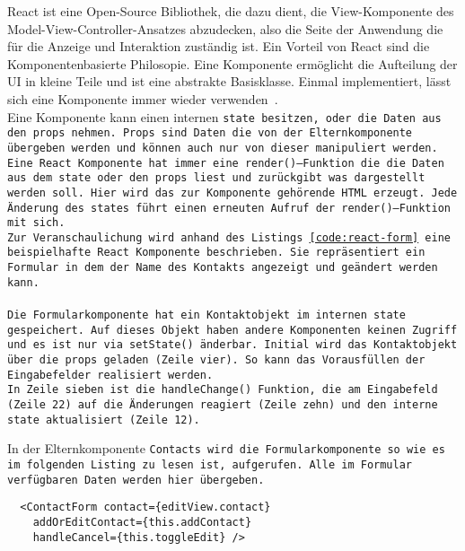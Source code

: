 React ist eine Open-Source Bibliothek, die dazu dient, die View-Komponente des Model-View-Controller-Ansatzes abzudecken, also die Seite der Anwendung die für die Anzeige und Interaktion zuständig ist. Ein Vorteil von React sind die Komponentenbasierte Philosopie. Eine Komponente ermöglicht die Aufteilung der \gls{UI} in kleine Teile und ist eine abstrakte Basisklasse. Einmal implementiert, lässt sich eine Komponente immer wieder verwenden~\cite{react}.\\
Eine Komponente kann einen internen \tt{state} besitzen, oder die Daten aus den \tt{props} nehmen.
\tt{Props} sind Daten die von der Elternkomponente übergeben werden und können auch nur von dieser manipuliert werden.
Eine React Komponente hat immer eine \tt{render()}--Funktion die die Daten aus dem \tt{state} oder den \tt{props} liest und zurückgibt was dargestellt werden soll.
Hier wird das zur Komponente gehörende \gls{HTML} erzeugt. Jede Änderung des \tt{states} führt einen erneuten Aufruf der \tt{render()}--Funktion mit sich.\\
Zur Veranschaulichung wird anhand des Listings \ref{code:react-form} eine beispielhafte React Komponente beschrieben.
Sie repräsentiert ein Formular in dem der Name des Kontakts angezeigt und geändert werden kann.\\\\
Die Formularkomponente hat ein Kontaktobjekt im internen \tt{state} gespeichert. Auf dieses Objekt haben andere Komponenten keinen Zugriff und es ist nur via \tt{setState()} änderbar.
Initial wird das Kontaktobjekt über die \tt{props} geladen (Zeile vier). So kann das Vorausfüllen der Eingabefelder realisiert werden.\\
In Zeile sieben ist die \tt{handleChange()} Funktion, die am Eingabefeld (Zeile 22) auf die Änderungen reagiert (Zeile zehn) und den interne \tt{state} aktualisiert (Zeile 12).
\begin{center}
  
\end{center}
%
In der Elternkomponente \tt{Contacts} wird die Formularkomponente so wie es im folgenden Listing zu lesen ist, aufgerufen.
Alle im Formular verfügbaren Daten werden hier übergeben.
\begin{lstlisting}
  <ContactForm contact={editView.contact}
    addOrEditContact={this.addContact}
    handleCancel={this.toggleEdit} />
\end{lstlisting}
